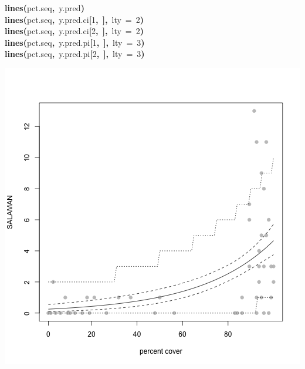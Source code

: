 \documentclass{article}
\makeatletter
\newcommand{\hlnumber}[1]{\textcolor[rgb]{0,0,0}{#1}}%
\newcommand{\hlfunctioncall}[1]{\textcolor[rgb]{.5,0,.33}{\textbf{#1}}}%
\newcommand{\hlkeyword}[1]{\textbf{#1}}%
\newcommand{\hlargument}[1]{\textcolor[rgb]{.69,.25,.02}{#1}}%
\newcommand{\hlsymbol}[1]{#1}%
\newcommand{\hlstd}[1]{\textcolor[rgb]{0,0,0}{#1}}%
\newenvironment{kframe}{%
 \def\FrameCommand##1{\hskip\@totalleftmargin \hskip-\fboxsep
 \colorbox{shadecolor}{##1}\hskip-\fboxsep
     \hskip-\linewidth \hskip-\@totalleftmargin \hskip\columnwidth}%
 \MakeFramed {\advance\hsize-\width
   \@totalleftmargin\z@ \linewidth\hsize
   \@setminipage}}%
 {\par\unskip\endMakeFramed}
\newenvironment{knitrout}{}{} %
\makeatother
\begin{document}
\begin{knitrout}
{\begin{kframe}
\begin{flushleft}
\hlstd{}\hlfunctioncall{lines}\hlkeyword{(}\hlsymbol{pct.seq}\hlkeyword{,}{\ }\hlsymbol{y.pred}\hlkeyword{)}\hspace*{\fill}\\
\hlstd{}\hlfunctioncall{lines}\hlkeyword{(}\hlsymbol{pct.seq}\hlkeyword{,}{\ }\hlsymbol{y.pred.ci}\hlkeyword{[}\hlnumber{1}\hlkeyword{,}{\ }\hlkeyword{]}\hlkeyword{,}{\ }\hlargument{lty}{\ }\hlargument{=}{\ }\hlnumber{2}\hlkeyword{)}\hspace*{\fill}\\
\hlstd{}\hlfunctioncall{lines}\hlkeyword{(}\hlsymbol{pct.seq}\hlkeyword{,}{\ }\hlsymbol{y.pred.ci}\hlkeyword{[}\hlnumber{2}\hlkeyword{,}{\ }\hlkeyword{]}\hlkeyword{,}{\ }\hlargument{lty}{\ }\hlargument{=}{\ }\hlnumber{2}\hlkeyword{)}\hspace*{\fill}\\
\hlstd{}\hlfunctioncall{lines}\hlkeyword{(}\hlsymbol{pct.seq}\hlkeyword{,}{\ }\hlsymbol{y.pred.pi}\hlkeyword{[}\hlnumber{1}\hlkeyword{,}{\ }\hlkeyword{]}\hlkeyword{,}{\ }\hlargument{lty}{\ }\hlargument{=}{\ }\hlnumber{3}\hlkeyword{)}\hspace*{\fill}\\
\hlstd{}\hlfunctioncall{lines}\hlkeyword{(}\hlsymbol{pct.seq}\hlkeyword{,}{\ }\hlsymbol{y.pred.pi}\hlkeyword{[}\hlnumber{2}\hlkeyword{,}{\ }\hlkeyword{]}\hlkeyword{,}{\ }\hlargument{lty}{\ }\hlargument{=}{\ }\hlnumber{3}\hlkeyword{)}\mbox{}
\normalfont
\end{flushleft}
\includegraphics{sal-fig1} \begin{flushleft}

\end{flushleft}
\end{kframe}}
\end{knitrout}
\end{document}
